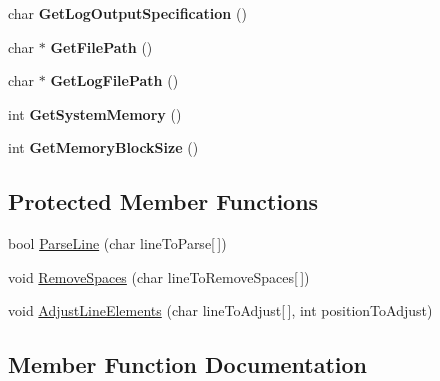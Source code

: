 \begin{DoxyCompactItemize}
\item 
char {\bfseries Get\+Log\+Output\+Specification} ()\hypertarget{class_config_file_input_ab912e1b4898d643e229c8093113eeeb7}{}\label{class_config_file_input_ab912e1b4898d643e229c8093113eeeb7}

\item 
char $\ast$ {\bfseries Get\+File\+Path} ()\hypertarget{class_config_file_input_aa9d2fba6514a5100922e6bddb4e2aaf5}{}\label{class_config_file_input_aa9d2fba6514a5100922e6bddb4e2aaf5}

\item 
char $\ast$ {\bfseries Get\+Log\+File\+Path} ()\hypertarget{class_config_file_input_aed8b12496389a14b9ffe831f9d830e2f}{}\label{class_config_file_input_aed8b12496389a14b9ffe831f9d830e2f}

\item 
int {\bfseries Get\+System\+Memory} ()\hypertarget{class_config_file_input_aec659579ad9ad2a18dd72ab410471af6}{}\label{class_config_file_input_aec659579ad9ad2a18dd72ab410471af6}

\item 
int {\bfseries Get\+Memory\+Block\+Size} ()\hypertarget{class_config_file_input_a505bd4703a5eae6e356cbb6aa6f6a1dd}{}\label{class_config_file_input_a505bd4703a5eae6e356cbb6aa6f6a1dd}

\end{DoxyCompactItemize}
\subsection*{Protected Member Functions}
\begin{DoxyCompactItemize}
\item 
bool \hyperlink{class_config_file_input_a0ce04d1364d6048e8e1b374a257c0fac}{Parse\+Line} (char line\+To\+Parse\mbox{[}$\,$\mbox{]})
\item 
void \hyperlink{class_config_file_input_a03db614273e102258ad420f21c127d04}{Remove\+Spaces} (char line\+To\+Remove\+Spaces\mbox{[}$\,$\mbox{]})
\item 
void \hyperlink{class_config_file_input_ac56e4a2363d4b4b3dc208a64530acd2f}{Adjust\+Line\+Elements} (char line\+To\+Adjust\mbox{[}$\,$\mbox{]}, int position\+To\+Adjust)
\end{DoxyCompactItemize}


\subsection{Member Function Documentation}
